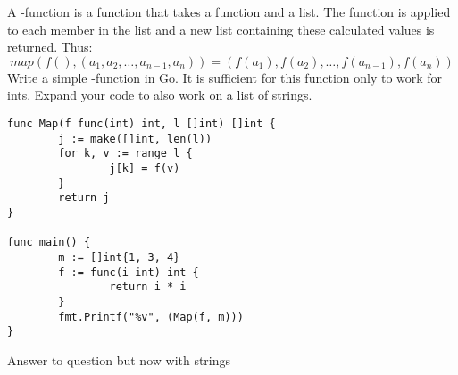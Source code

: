 \begin{Exercise}[title={Map function},difficulty=4]
\label{ex:map function}
A -function is a function that takes
a function and a list. The function is applied to 
each member in the list and a new list containing
these calculated values is returned.
Thus: 
$$ map(f(), (a_1,a_2,\ldots,a_{n-1},a_n)) =  (f(a_1), f(a_2),\ldots,f(a_{n-1}), f(a_n)) $$
\Question \label{ex:map function q1} Write a simple
-function in Go. It is sufficient
for this function only to work for ints.
\Question \label{ex:map function q2} Expand your code to also work on a list of strings.

\end{Exercise}

\begin{Answer}

\Question 
\begin{lstlisting}[caption=A Map function]
func Map(f func(int) int, l []int) []int {
        j := make([]int, len(l))
        for k, v := range l {
                j[k] = f(v)
        }
        return j
}

func main() {
        m := []int{1, 3, 4}
        f := func(i int) int {
                return i * i
        }
        fmt.Printf("%v", (Map(f, m)))
}
\end{lstlisting}

\Question Answer to question but now with strings
\end{Answer}


